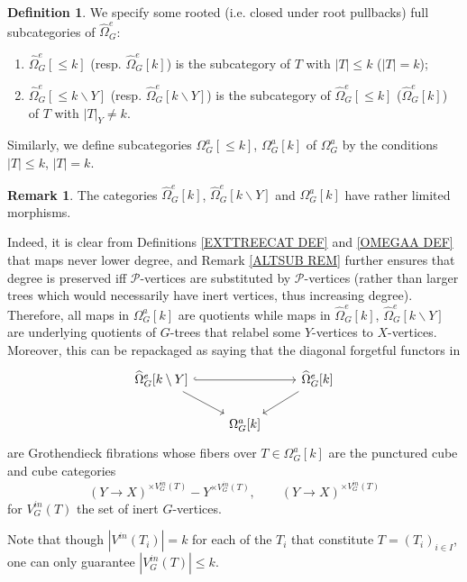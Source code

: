 \documentclass[a4paper,10pt
,draft
]{article}%
\numberwithin{equation}{section}
\numberwithin{figure}{section}
\theoremstyle{definition} %
\newtheorem{definition}[equation]{Definition}%
\newtheorem{remark}[equation]{Remark}%
\newcommand{\1}{\ensuremath{\mathbbm 1}}%
\begin{document}
\begin{definition}\label{TREE_FILTRATION_PIECES_DEFINITION}
We specify some rooted (i.e. closed under root pullbacks)
full subcategories
 of $\widehat{\Omega}_{G}^e$: 
  \begin{enumerate}
  \item $\widehat{\Omega}_G^e[\leq\! k]$ 
  (resp. $\widehat{\Omega}_G^e[k]$) is the subcategory of $T$ with $|T|\leq k$ ($|T| = k$);
  \item $\widehat{\Omega}_G^e[\leq\! k \mathbin{\backslash} Y]$
  (resp. $\widehat{\Omega}_G^e[k \mathbin{\backslash} Y]$) is the subcategory of $\widehat{\Omega}_G^e[\leq\! k]$ 
  ($\widehat{\Omega}_G^e[k]$) of $T$ with $|T|_{Y}\neq k$.
  \end{enumerate}
Similarly, we define subcategories 
$\Omega_G^a[\leq \! k]$, 
$\Omega_G^a[k]$ of $\Omega_G^a$
by the conditions $|T|\leq k$, $|T|=k$.
\end{definition}


\begin{remark}\label{LIMMOR REM}
  The categories 
  $\widehat{\Omega}_G^e[k]$, $\widehat{\Omega}_G^e[k \mathbin{\backslash} Y]$ and $\Omega_G^a[k]$
  have rather limited morphisms.
  
Indeed, it is clear from Definitions 
\ref{EXTTREECAT DEF} and \ref{OMEGAA DEF} 
that maps never lower degree,
and Remark \ref{ALTSUB REM} further ensures that degree is preserved iff
$\mathcal{P}$-vertices are substituted by $\mathcal{P}$-vertices (rather than larger trees
which would necessarily have inert vertices, thus increasing degree).
Therefore, all maps in $\Omega_G^a[k]$ are quotients while maps in $\widehat{\Omega}_G^e[k]$, $\widehat{\Omega}_G^e[k \mathbin{\backslash} Y]$
are underlying quotients of $G$-trees that 
relabel some $Y$-vertices to $X$-vertices.  
 Moreover, this can be repackaged as saying that 
  the diagonal forgetful functors in
\[
\begin{tikzcd}
  \widehat\Omega_G^e[k \mathbin{\backslash} Y] \arrow[dr] \arrow[rr, hookrightarrow] 
  && \widehat\Omega_G^e[k] \arrow[dl]\\
  & \Omega_G^a[k]
\end{tikzcd}
\]  
 are Grothendieck fibrations whose fibers over 
 $T \in \Omega_G^a[k]$
 are the punctured cube and cube categories
\begin{equation}\label{PUNCUBE EQ}
	(Y \to X)^{\times V_G^{in}(T)} - Y^{\times  V_G^{in}(T)},
\qquad
	(Y \to X)^{\times V_G^{in}(T)}
\end{equation}
for $V_G^{in}(T)$ the set of inert $G$-vertices.

Note that though 
$|V^{in}(T_i)| = k$
for each of the $T_i$ that constitute $T=(T_i)_{i \in I}$,
one can only guarantee $|V_G^{in}(T)| \leq k$.
\end{remark}
\end{document}

